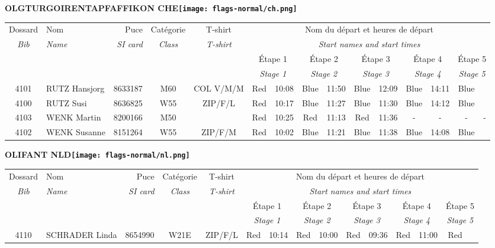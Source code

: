 \documentclass{report}
\begin{document}
\newpage
  \Huge \centering \bfseries OLGTURGOIRENTAPFAFFIKON  CHE\normalfont \footnotesize \sffamily \hfill \texttt{[image: flags-normal/ch.png]} \newline 
  \begin{longtable}{|c|l|r|c|c|*{5}{cc|}}
    Dossard & Nom  & Puce    & Catégorie & T-shirt & \multicolumn{10}{c|}{Nom du départ et heures de départ} \\
    \itshape Bib     & \itshape Name & \itshape SI card & \itshape Class  & \itshape  T-shirt  & \multicolumn{10}{c|}{\itshape Start names and start times} \\
    \hline
    & & & & & \multicolumn{2}{c|}{Étape 1} & \multicolumn{2}{c|}{Étape 2} & \multicolumn{2}{c|}{Étape 3} & \multicolumn{2}{c|}{Étape 4} & \multicolumn{2}{c|}{Étape 5} \\
    & & & & & \multicolumn{2}{c|}{\itshape Stage 1} & \multicolumn{2}{c|}{\itshape Stage 2} & \multicolumn{2}{c|}{\itshape Stage 3} & \multicolumn{2}{c|}{\itshape Stage 4} & \multicolumn{2}{c|}{\itshape Stage 5} \\
    \hline
    4101 & RUTZ Hansjorg & 8633187 & M60 & COL V/M/M & Red & 10:08 & Blue & 11:50 & Blue & 12:09 & Blue & 14:11 & Blue &  \\
    4100 & RUTZ Susi & 8636825 & W55 & ZIP/F/L & Red & 10:17 & Blue & 11:27 & Blue & 11:30 & Blue & 14:12 & Blue &  \\
    4103 & WENK Martin & 8200166 & M50 &   & Red & 10:25 & Red & 11:13 & Red & 11:36 & - &  - & - &  -\\
    4102 & WENK Susanne & 8151264 & W55 & ZIP/F/M & Red & 10:02 & Blue & 11:21 & Blue & 11:38 & Blue & 14:08 & Blue &  \\
  \end{longtable}
\newpage
  \Huge \centering \bfseries OLIFANT  NLD\normalfont \footnotesize \sffamily \hfill \texttt{[image: flags-normal/nl.png]} \newline 
  \begin{longtable}{|c|l|r|c|c|*{5}{cc|}}
    Dossard & Nom  & Puce    & Catégorie & T-shirt & \multicolumn{10}{c|}{Nom du départ et heures de départ} \\
    \itshape Bib     & \itshape Name & \itshape SI card & \itshape Class  & \itshape  T-shirt  & \multicolumn{10}{c|}{\itshape Start names and start times} \\
    \hline
    & & & & & \multicolumn{2}{c|}{Étape 1} & \multicolumn{2}{c|}{Étape 2} & \multicolumn{2}{c|}{Étape 3} & \multicolumn{2}{c|}{Étape 4} & \multicolumn{2}{c|}{Étape 5} \\
    & & & & & \multicolumn{2}{c|}{\itshape Stage 1} & \multicolumn{2}{c|}{\itshape Stage 2} & \multicolumn{2}{c|}{\itshape Stage 3} & \multicolumn{2}{c|}{\itshape Stage 4} & \multicolumn{2}{c|}{\itshape Stage 5} \\
    \hline
    4110 & SCHRADER Linda & 8654990 & W21E & ZIP/F/L & Red & 10:14 & Red & 10:00 & Red & 09:36 & Red & 11:00 & Red &  \\
  \end{longtable}
\end{document}
